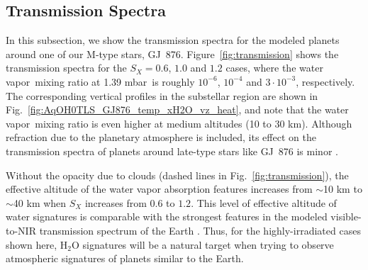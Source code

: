 \documentclass[11pt,numberedappendix,twocolappendix,]{emulateapj}
\def\water{H$_2$O }
\def\preslevel{1.39 mbar\ }
\newcommand{\wv}{water vapor\ }
\begin{document}
\subsection{Transmission Spectra}
\label{ss:result_TransmissionSpectra}

In this subsection, we show the transmission spectra for the modeled planets around one of our M-type stars, GJ~876. 
Figure~\ref{fig:transmission} shows the transmission spectra for the $S_X=0.6$, $1.0$ and $1.2$ cases, where the \wv mixing ratio at \preslevel is roughly $10^{-6}$, $10^{-4}$ and $3\cdot 10^{-3}$, respectively. 
The corresponding vertical profiles in the substellar region are shown in Fig.~\ref{fig:AqOH0TLS_GJ876_temp_xH2O_vz_heat}, and note that the \wv mixing ratio is even higher at medium altitudes (10 to 30 km).
Although refraction due to the planetary atmosphere is included, its effect on the transmission spectra of planets around late-type stars like GJ~876 is minor \citep{Betremieux2014,Misra2014}. 


Without the opacity due to clouds (dashed lines in Fig.~\ref{fig:transmission}), the effective altitude of the water vapor absorption features increases from $\sim $10 km to $\sim $40 km when $S_X$ increases from $0.6$ to $1.2$. 
This level of effective altitude of water signatures is comparable with the strongest features in the modeled visible-to-NIR transmission spectrum of the Earth \citep[e.g.,][]{Kaltenegger2009}.
Thus, for the highly-irradiated cases shown here, \water signatures will be a natural target when trying to observe atmospheric signatures of planets similar to the Earth. 
\end{document}
